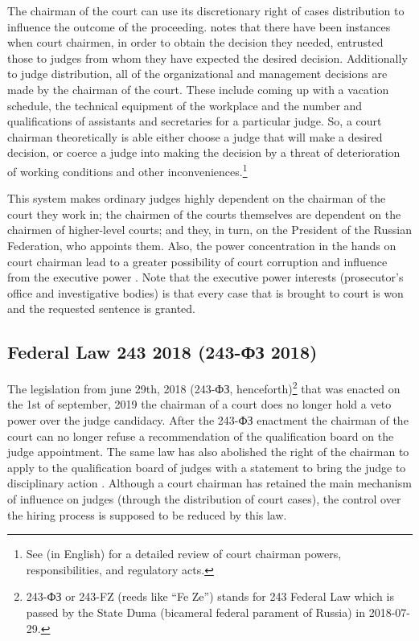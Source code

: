 \documentclass[12pt]{article}
\numberwithin{equation}{section}
\numberwithin{table}{section}
\numberwithin{figure}{section}
\begin{document}
The chairman of the court can use its discretionary right of cases distribution to influence the outcome of the proceeding. 
\citet{Makarova2017} notes that there have been instances when court chairmen, in order to obtain the decision they needed, entrusted those to judges from whom they have expected the desired decision. 
Additionally to judge distribution, all of the  organizational and management decisions are made by the chairman of the court. 
These include coming up with a vacation schedule, the technical equipment of the workplace and the number and qualifications of assistants and secretaries for a particular judge. 
So, a court chairman theoretically is able either choose a judge that will make a desired decision, or coerce a judge into making the decision by a threat of deterioration of working conditions and other inconveniences.\footnote{See \citet{Zholobov2022} (in English) for a detailed review of court chairman powers, responsibilities, and regulatory acts.}


This system makes ordinary judges highly dependent on the chairman of the court they work in; the chairmen of the courts themselves are dependent on the chairmen of higher-level courts; and they, in turn, on the President of the Russian Federation, who appoints them.
Also, the power concentration in the hands on court chairman lead to a greater possibility of court corruption and influence from the executive power \citep{Zholobov2022}.  
Note that the executive power interests (prosecutor's office and investigative bodies) is that every case that is brought to court is won and the requested sentence is granted. 



\subsection{Federal Law 243 2018 (243-ФЗ 2018)}
\label{subsection:243}

The legislation from june 29th, 2018 (243-ФЗ, henceforth)\footnote{243-ФЗ or 243-FZ (reeds like ``Fe Ze'')  stands for 243 Federal Law which is passed by the State Duma (bicameral federal parament of Russia) in 2018-07-29.} that was enacted on the 1st of september, 2019 the chairman of a court does no longer hold a veto power over the judge candidacy. 
After the 243-ФЗ enactment the chairman of the court can no longer refuse a recommendation of the qualification board on the judge appointment. 
The same law has also abolished the right of the chairman to apply to the qualification board of judges with a statement to bring the judge to disciplinary action \citep{Koroleva2021}.
Although a court chairman has retained the main mechanism of influence on judges (through the distribution of court cases), the control over the hiring process is supposed to be reduced by this law. 
\end{document}
